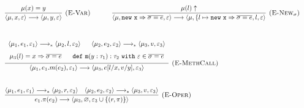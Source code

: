 \documentclass{llncs}
\newcommand{\keywadj}[1]{\mathtt{#1}}
\newcommand{\keyw}[1]{\keywadj{#1}~}
\newcommand{\config}[1] { \langle #1 \rangle }
\begin{document}
\fbox{$\config{\mu, e, \varepsilon} \simeq \config{\mu, e, \varepsilon}$}

\[
\begin{array}{lll}
\begin{array}{lllr}
	\infer[\textsc{(E-Var)}]
		{\config{\mu, x, \varepsilon} \longrightarrow \config{\mu, y, \varepsilon}}
		{\mu(x) = y}
~~~~~~~~~~
	\infer[\textsc{(E-New$_\sigma$)}]
		{\config{\mu, \keywadj{new~x} \Rightarrow \overline{\sigma = e}, \varepsilon} \longrightarrow \config{\mu, \{ l \mapsto \keywadj{new~x} \Rightarrow \overline{\sigma = e} , l, \varepsilon}}
		{\mu(l) \uparrow} \\[5ex]
		
	\infer[\textsc{(E-MethCall)}]
		{\config{\mu_1, e_1.m(e_2), \varepsilon_1} \longrightarrow \config{\mu_3, e[l/x, v/y], \varepsilon_3}}
  		{\def\arraystretch{1.6}
  			\begin{array}{c}
  				\config{\mu_1, e_1, \varepsilon_1} \longrightarrow_* \config{\mu_2, l, \varepsilon_2} ~~~~~
  		        \config{\mu_2, e_2, \varepsilon_2} \longrightarrow_* \config{\mu_3, v, \varepsilon_3} \\
  		        \mu_3(l) = x \Rightarrow \overline{\sigma = e} ~~~~~
			    \keywadj{def~m}(y: \tau_1) : \tau_2~\keyw{with} \varepsilon \in \overline {\sigma = e}
			\end{array} }\\[5ex]
			
	\infer[\textsc{(E-Oper)}]
		{e_1.\pi(e_2) \longrightarrow \config{\mu_3, \varnothing, \varepsilon_3 \cup \{ (r, \pi) \}}}
		{\config{\mu_1, e_1, \varepsilon_1} \longrightarrow_* \config{\mu_2, r, \varepsilon_2}
      & \config{\mu_2, e_2, \varepsilon_2} \longrightarrow_* \config{\mu_3, v, \varepsilon_3} } \\[5ex]
		
\end{array}
\end{array}
\]
\end{document}
